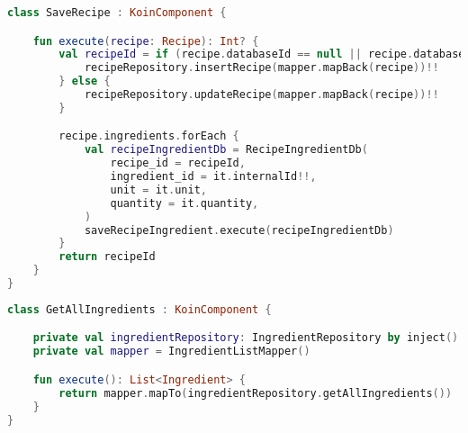 \begin{lstlisting}[caption={Interactor - Rezept speichern},label={lst:saveRecipe_interactor}, language=kotlin]
class SaveRecipe : KoinComponent {

    fun execute(recipe: Recipe): Int? {
        val recipeId = if (recipe.databaseId == null || recipe.databaseId == 0) {
            recipeRepository.insertRecipe(mapper.mapBack(recipe))!!
        } else {
            recipeRepository.updateRecipe(mapper.mapBack(recipe))!!
        }

        recipe.ingredients.forEach {
            val recipeIngredientDb = RecipeIngredientDb(
                recipe_id = recipeId,
                ingredient_id = it.internalId!!,
                unit = it.unit,
                quantity = it.quantity,
            )
            saveRecipeIngredient.execute(recipeIngredientDb)
        }
        return recipeId
    }
}
\end{lstlisting}

\begin{lstlisting}[caption={Interactor - Alle Zutaten laden},label={lst:interactor_getAllIngredients}, language=kotlin]
class GetAllIngredients : KoinComponent {

    private val ingredientRepository: IngredientRepository by inject()
    private val mapper = IngredientListMapper()

    fun execute(): List<Ingredient> {
        return mapper.mapTo(ingredientRepository.getAllIngredients())
    }
}
\end{lstlisting}